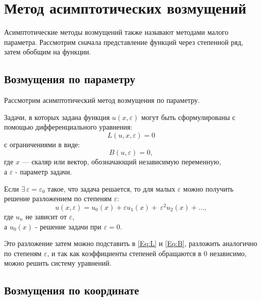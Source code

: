 \chapter*{Метод асимптотических возмущений}

Асимптотические методы возмущений
также называют методами малого параметра.
Рассмотрим сначала представление функций
через степенной ряд, затем обобщим на функции.

\section*{Возмущения по параметру}
Рассмотрим асимптотический метод возмущения по параметру.

Задачи, в которых задана функция $u(x, \varepsilon)$
могут быть сформулированы с помощью
дифференциального уравнения:
\begin{equation}
    \label{Eq:L}
    L(u, x, \varepsilon) = 0
\end{equation}
с ограничениями в виде:
\begin{equation}
    \label{Eq:B}
    B(u, \varepsilon) = 0,
\end{equation}
где $x$ --- скаляр или вектор, обозначающий независимую переменную,\\
а $\varepsilon$ - параметр задачи.

Если $\exists \, \varepsilon = \varepsilon_0$
такое, что задача решается, то для малых $\varepsilon$
можно получить решение разложением по степеням $\varepsilon$:
\begin{equation*}
   u(x, \varepsilon) = u_0(x) + \varepsilon u_1(x) + \
   \varepsilon^2 u_2(x) + \dots,
\end{equation*}
где $u_n$ не зависит от $\varepsilon$,\\
а $u_0(x)$ - решение задачи при $\varepsilon = 0$.

Это разложение затем можно подставить
в \eqref{Eq:L} и \eqref{Eq:B},
разложить аналогично по степеням $\varepsilon$,
и так как коэффициенты степеней обращаются в 0 независимо,
можно решить систему уравнений.

\clearpage
\section*{Возмущения по координате}

